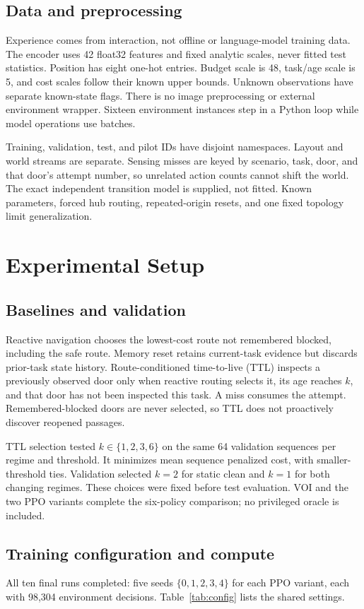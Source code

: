 \documentclass[journal]{IEEEtai}
\begin{document}
\subsection{Data and preprocessing}
Experience comes from interaction, not offline or language-model training data. The encoder uses 42 float32 features and fixed analytic scales, never fitted test statistics. Position has eight one-hot entries. Budget scale is 48, task/age scale is 5, and cost scales follow their known upper bounds. Unknown observations have separate known-state flags. There is no image preprocessing or external environment wrapper. Sixteen environment instances step in a Python loop while model operations use batches.

Training, validation, test, and pilot IDs have disjoint namespaces. Layout and world streams are separate. Sensing misses are keyed by scenario, task, door, and that door's attempt number, so unrelated action counts cannot shift the world. The exact independent transition model is supplied, not fitted. Known parameters, forced hub routing, repeated-origin resets, and one fixed topology limit generalization.

\section{Experimental Setup}
\subsection{Baselines and validation}
Reactive navigation chooses the lowest-cost route not remembered blocked, including the safe route. Memory reset retains current-task evidence but discards prior-task state history. Route-conditioned time-to-live (TTL) inspects a previously observed door only when reactive routing selects it, its age reaches $k$, and that door has not been inspected this task. A miss consumes the attempt. Remembered-blocked doors are never selected, so TTL does not proactively discover reopened passages.

TTL selection tested $k\in\{1,2,3,6\}$ on the same 64 validation sequences per regime and threshold. It minimizes mean sequence penalized cost, with smaller-threshold ties. Validation selected $k=2$ for static clean and $k=1$ for both changing regimes. These choices were fixed before test evaluation. VOI and the two PPO variants complete the six-policy comparison; no privileged oracle is included.

\subsection{Training configuration and compute}
All ten final runs completed: five seeds $\{0,1,2,3,4\}$ for each PPO variant, each with 98,304 environment decisions. Table~\ref{tab:config} lists the shared settings.
\end{document}
